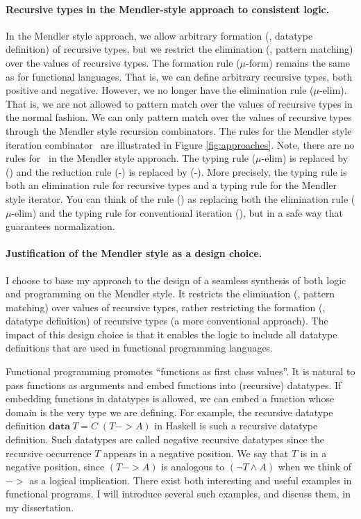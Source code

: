 \paragraph{Recursive types in the Mendler-style approach to consistent logic.}
In the Mendler style approach, we allow arbitrary formation
(\ie, datatype definition) of recursive types, but we restrict
the elimination (\ie, pattern matching) over the values of recursive types. 
The formation rule {\small($\mu$-form)} remains the same as
for functional languages. That is, we can define arbitrary recursive types,
both positive and negative. However, we no longer have the elimination
rule {\small($\mu$-elim)}. That is, we are not allowed to pattern match over
the values of recursive types in the normal fashion. We can only pattern match
over the values of recursive types through the Mendler style recursion
combinators. The rules for the Mendler style iteration combinator \MIt\
are illustrated in Figure \ref{fig:approaches}.
Note, there are no rules for \unIn\ in the Mendler style approach.
The typing rule {\small($\mu$-elim)} is replaced by {\small(\MIt)} and
the reduction rule {\small(\unIn-\In)} is replaced by {\small(\MIt-\In)}.
More precisely, the typing rule {\small \MIt} is both an elimination rule
for recursive types and a typing rule for the Mendler style iterator.
You can think of the rule {\small(\MIt)} as replacing both the elimination rule
{\small($\mu$-elim)} and the typing rule for conventional iteration
{\small(\It)}, but in a safe way that guarantees normalization.

\paragraph{Justification of the Mendler style as a design choice.}
I choose to base my approach to the design of a seamless synthesis of both
logic and programming on the Mendler style. It restricts the elimination (\ie,
pattern matching) over values of recursive types, rather restricting the
formation (\ie, datatype definition) of recursive types (a more conventional
approach). The impact of this design choice is that it enables the logic to
include all datatype definitions that are used in functional programming
languages.

Functional programming promotes ``functions as first class values''.
It is natural to pass functions as arguments and embed functions into
(recursive) datatypes. If embedding functions in datatypes is allowed,
we can embed a function whose domain is the very type we are defining.
For example, the recursive datatype definition
$\mathbf{data}~T = C\;(T -> \textit{A})$ in Haskell is such a recursive
datatype definition. Such datatypes are called negative recursive datatypes
since the recursive occurrence $T$ appears in a negative position.
We say that $T$ is in a negative position, since $(T -> A)$ is analogous to
$(\neg T \land A)$ when we think of $->$ as a logical implication. There exist
both interesting and useful examples in functional programs. I will
introduce several such examples, and discuss them, in my dissertation.

